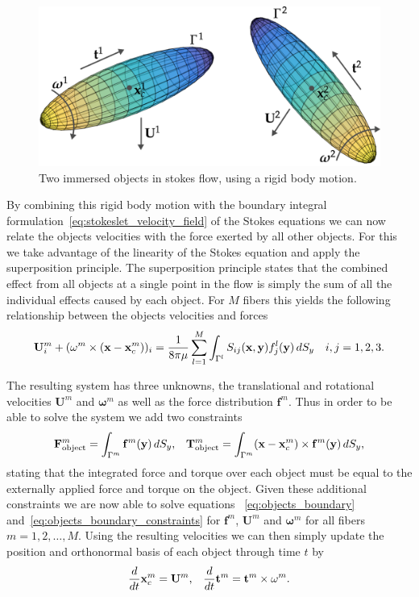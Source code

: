 \begin{figure}[!htbp]
  \centering
  \includegraphics[width=.8\textwidth]{img/immersed_rigid.png}
  \caption{Two immersed objects in stokes flow, using a rigid body motion.}
  \label{fig:immersed_rigid}
\end{figure}

By combining this rigid body motion with the boundary integral formulation~\eqref{eq:stokeslet_velocity_field} of the Stokes equations we can now relate the objects velocities with the force exerted by all other objects. For this we take advantage of the linearity of the Stokes equation and apply the superposition principle. The superposition principle states that the combined effect from all objects at a single point in the flow is simply the sum of all the individual effects caused by each object. For $M$ fibers this yields the following relationship between the objects velocities and forces
\begin{equation}
  \label{eq:objects_boundary}
	\mathbf{U}_i^m + (\mathbf{\omega}^m \times (\mathbf{x} - \mathbf{x}_c^m))_i = \frac{1}{8 \pi \mu} \sum_{l=1}^{M} \int_{\Gamma^l} S_{ij}(\mathbf{x},\mathbf{y})f_j^l(\mathbf{y}) \, dS_y \quad i,j =1,2,3 \text{.}
\end{equation}

The resulting system has three unknowns, the translational and rotational velocities $\mathbf{U}^m$ and $\mathbf{\omega}^m$ as well as the force distribution $\mathbf{f}^m$. Thus in order to be able to solve the system we add two constraints
\begin{equation}
	\label{eq:objects_boundary_constraints}
	\mathbf{F}_{\text{object}}^m = \int_{\Gamma^m} \mathbf{f}^m(\mathbf{y}) \, dS_y\text{,} \quad \mathbf{T}_{\text{object}}^m = \int_{\Gamma^m} (\mathbf{x} - \mathbf{x}_c^m) \times \mathbf{f}^m(\mathbf{y}) \, dS_y \text{,}
\end{equation}
stating that the integrated force and torque over each object must be equal to the externally applied force and torque on the object. Given these additional constraints we are now able to solve equations ~\eqref{eq:objects_boundary} and~\eqref{eq:objects_boundary_constraints} for $\mathbf{f}^m$, $\mathbf{U}^m$ and $\mathbf{\omega}^m$ for all fibers $m=1,2,\dots,M$. Using the resulting velocities we can then simply update the position and orthonormal basis of each object through time $t$ by
\begin{equation}
	\label{eq:objects_update}
	\frac{d}{dt}\mathbf{x}_c^m = \mathbf{U}^m \text{,} \quad \frac{d}{dt}\mathbf{t}^m = \mathbf{t}^m \times \mathbf{\omega}^m \text{.}
\end{equation}

